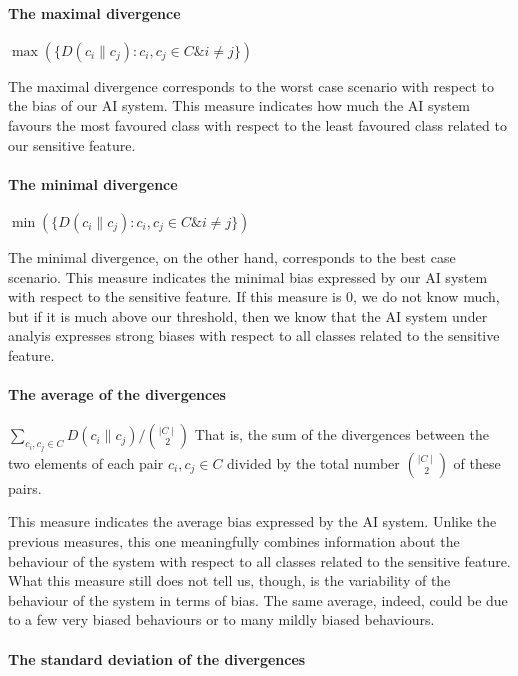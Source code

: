 \documentclass[
]{ceurart}
\begin{document}
\paragraph{The maximal divergence}

$\max (\{D(c_i\parallel c_j): c_i,c_j\in C \& i\neq j\})$

The maximal divergence corresponds to the worst case scenario with respect to the bias of our AI system. This measure indicates how much the AI system favours the most favoured class with respect to the least favoured class related to our sensitive feature.

\paragraph{The minimal divergence}

$\min (\{D(c_i\parallel c_j): c_i,c_j\in C \& i\neq j\})$


The minimal divergence, on the other hand, corresponds to the best case scenario.  This measure indicates the minimal bias expressed by our AI system with respect to the sensitive feature. If this measure is $0$, we do not know much, but if it is much above our threshold, then we know that the AI system under analyis expresses strong biases with respect to all classes related to the sensitive feature.


\paragraph{The average of the divergences}

$\sum_{c_i,c_j\in C} D(c_i\parallel c_j)/\binom{\mid C\mid}{2}$ That is, the sum of the divergences between the two elements of each pair $c_i,c_j\in C$ divided by the total number $\binom{\mid C\mid}{2}$ of these pairs.

This measure indicates the average bias expressed by the AI system. Unlike the previous measures, this one meaningfully combines information about the behaviour of the system with respect to all classes related to the sensitive feature.  What this measure still does not tell us, though, is the variability of the behaviour of the system in terms of bias. The same average, indeed, could be due to a few very biased behaviours or to many mildly biased behaviours.


\paragraph{The standard deviation of the divergences}
\end{document}
